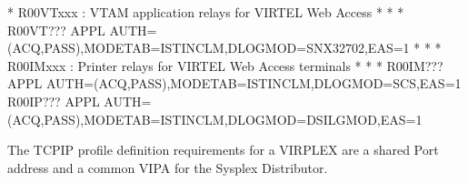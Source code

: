 \documentclass[letterpaper,10pt,english]{sphinxmanual}
\begin{document}
\begin{sphinxVerbatim}[commandchars=\\\{\}]
* R00VTxxx    : VTAM application relays for VIRTEL Web Access        *
* \PYGZhy{}\PYGZhy{}\PYGZhy{}\PYGZhy{}\PYGZhy{}\PYGZhy{}\PYGZhy{}\PYGZhy{}\PYGZhy{}\PYGZhy{}\PYGZhy{}\PYGZhy{}\PYGZhy{}\PYGZhy{}\PYGZhy{}\PYGZhy{}\PYGZhy{}\PYGZhy{}\PYGZhy{}\PYGZhy{}\PYGZhy{}\PYGZhy{}\PYGZhy{}\PYGZhy{}\PYGZhy{}\PYGZhy{}\PYGZhy{}\PYGZhy{}\PYGZhy{}\PYGZhy{}\PYGZhy{}\PYGZhy{}\PYGZhy{}\PYGZhy{}\PYGZhy{}\PYGZhy{}\PYGZhy{}\PYGZhy{}\PYGZhy{}\PYGZhy{}\PYGZhy{}\PYGZhy{}\PYGZhy{}\PYGZhy{}\PYGZhy{}\PYGZhy{}\PYGZhy{}\PYGZhy{}\PYGZhy{}\PYGZhy{}\PYGZhy{}\PYGZhy{}\PYGZhy{}\PYGZhy{}\PYGZhy{}\PYGZhy{}\PYGZhy{}\PYGZhy{}\PYGZhy{}\PYGZhy{}\PYGZhy{}\PYGZhy{}\PYGZhy{}\PYGZhy{}\PYGZhy{}\PYGZhy{} *
R00VT??? APPL  AUTH=(ACQ,PASS),MODETAB=ISTINCLM,DLOGMOD=SNX32702,EAS=1
* \PYGZhy{}\PYGZhy{}\PYGZhy{}\PYGZhy{}\PYGZhy{}\PYGZhy{}\PYGZhy{}\PYGZhy{}\PYGZhy{}\PYGZhy{}\PYGZhy{}\PYGZhy{}\PYGZhy{}\PYGZhy{}\PYGZhy{}\PYGZhy{}\PYGZhy{}\PYGZhy{}\PYGZhy{}\PYGZhy{}\PYGZhy{}\PYGZhy{}\PYGZhy{}\PYGZhy{}\PYGZhy{}\PYGZhy{}\PYGZhy{}\PYGZhy{}\PYGZhy{}\PYGZhy{}\PYGZhy{}\PYGZhy{}\PYGZhy{}\PYGZhy{}\PYGZhy{}\PYGZhy{}\PYGZhy{}\PYGZhy{}\PYGZhy{}\PYGZhy{}\PYGZhy{}\PYGZhy{}\PYGZhy{}\PYGZhy{}\PYGZhy{}\PYGZhy{}\PYGZhy{}\PYGZhy{}\PYGZhy{}\PYGZhy{}\PYGZhy{}\PYGZhy{}\PYGZhy{}\PYGZhy{}\PYGZhy{}\PYGZhy{}\PYGZhy{}\PYGZhy{}\PYGZhy{}\PYGZhy{}\PYGZhy{}\PYGZhy{}\PYGZhy{}\PYGZhy{}\PYGZhy{}\PYGZhy{} *
* R00IMxxx    : Printer relays for VIRTEL Web Access terminals       *
* \PYGZhy{}\PYGZhy{}\PYGZhy{}\PYGZhy{}\PYGZhy{}\PYGZhy{}\PYGZhy{}\PYGZhy{}\PYGZhy{}\PYGZhy{}\PYGZhy{}\PYGZhy{}\PYGZhy{}\PYGZhy{}\PYGZhy{}\PYGZhy{}\PYGZhy{}\PYGZhy{}\PYGZhy{}\PYGZhy{}\PYGZhy{}\PYGZhy{}\PYGZhy{}\PYGZhy{}\PYGZhy{}\PYGZhy{}\PYGZhy{}\PYGZhy{}\PYGZhy{}\PYGZhy{}\PYGZhy{}\PYGZhy{}\PYGZhy{}\PYGZhy{}\PYGZhy{}\PYGZhy{}\PYGZhy{}\PYGZhy{}\PYGZhy{}\PYGZhy{}\PYGZhy{}\PYGZhy{}\PYGZhy{}\PYGZhy{}\PYGZhy{}\PYGZhy{}\PYGZhy{}\PYGZhy{}\PYGZhy{}\PYGZhy{}\PYGZhy{}\PYGZhy{}\PYGZhy{}\PYGZhy{}\PYGZhy{}\PYGZhy{}\PYGZhy{}\PYGZhy{}\PYGZhy{}\PYGZhy{}\PYGZhy{}\PYGZhy{}\PYGZhy{}\PYGZhy{}\PYGZhy{}\PYGZhy{} *
R00IM??? APPL  AUTH=(ACQ,PASS),MODETAB=ISTINCLM,DLOGMOD=SCS,EAS=1
R00IP??? APPL  AUTH=(ACQ,PASS),MODETAB=ISTINCLM,DLOGMOD=DSILGMOD,EAS=1
\end{sphinxVerbatim}

\ignorespaces 
{}
The TCPIP profile definition requirements for a VIRPLEX are a shared Port address and a common VIPA for the Sysplex Distributor.
\end{document}
